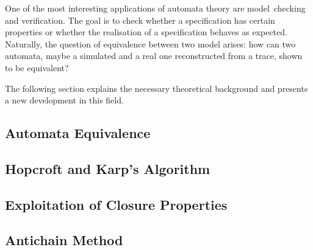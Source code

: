     One of the most interesting applications of automata theory are model~checking and verification.
    The goal is to check whether a specification has certain properties
    or whether the realisation of a specification behaves as expected.
    Naturally, the question of equivalence between two model arises:
    how can two automata, maybe a simulated and a real one reconstructed from a trace,
    shown to be equivalent?

    The following section explains the necessary theoretical background and presents a
    new development in this field.

    \subsection{Automata Equivalence}
    

    \subsection{Hopcroft and Karp's Algorithm}
    

    \subsection{Exploitation of Closure Properties}

    \subsection{Antichain Method}
